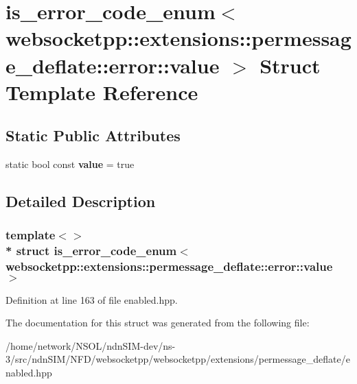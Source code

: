 \hypertarget{structis__error__code__enum_3_01websocketpp_1_1extensions_1_1permessage__deflate_1_1error_1_1value_01_4}{}\section{is\+\_\+error\+\_\+code\+\_\+enum$<$ websocketpp\+:\+:extensions\+:\+:permessage\+\_\+deflate\+:\+:error\+:\+:value $>$ Struct Template Reference}
\label{structis__error__code__enum_3_01websocketpp_1_1extensions_1_1permessage__deflate_1_1error_1_1value_01_4}
\subsection*{Static Public Attributes}
\begin{DoxyCompactItemize}
\item 
static bool const {\bfseries value} = true\hypertarget{structis__error__code__enum_3_01websocketpp_1_1extensions_1_1permessage__deflate_1_1error_1_1value_01_4_a1ceffb56a9c084320554bdf454b3b88f}{}\label{structis__error__code__enum_3_01websocketpp_1_1extensions_1_1permessage__deflate_1_1error_1_1value_01_4_a1ceffb56a9c084320554bdf454b3b88f}

\end{DoxyCompactItemize}


\subsection{Detailed Description}
\subsubsection*{template$<$$>$\\*
struct is\+\_\+error\+\_\+code\+\_\+enum$<$ websocketpp\+::extensions\+::permessage\+\_\+deflate\+::error\+::value $>$}



Definition at line 163 of file enabled.\+hpp.



The documentation for this struct was generated from the following file\+:\begin{DoxyCompactItemize}
\item 
/home/network/\+N\+S\+O\+L/ndn\+S\+I\+M-\/dev/ns-\/3/src/ndn\+S\+I\+M/\+N\+F\+D/websocketpp/websocketpp/extensions/permessage\+\_\+deflate/enabled.\+hpp\end{DoxyCompactItemize}
